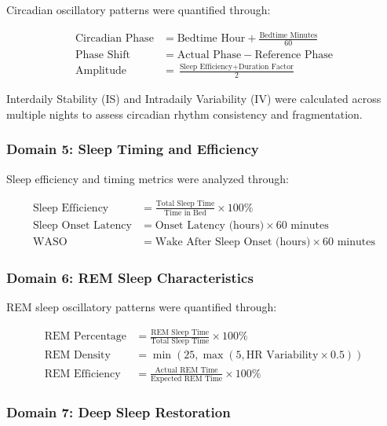 \documentclass[twocolumn]{article}
\begin{document}
Circadian oscillatory patterns were quantified through:

\begin{align}
\text{Circadian Phase} &= \text{Bedtime Hour} + \frac{\text{Bedtime Minutes}}{60} \\
\text{Phase Shift} &= \text{Actual Phase} - \text{Reference Phase} \\
\text{Amplitude} &= \frac{\text{Sleep Efficiency} + \text{Duration Factor}}{2}
\end{align}

Interdaily Stability (IS) and Intradaily Variability (IV) were calculated across multiple nights to assess circadian rhythm consistency and fragmentation.

\subsubsection{Domain 5: Sleep Timing and Efficiency}

Sleep efficiency and timing metrics were analyzed through:

\begin{align}
\text{Sleep Efficiency} &= \frac{\text{Total Sleep Time}}{\text{Time in Bed}} \times 100\% \\
\text{Sleep Onset Latency} &= \text{Onset Latency (hours)} \times 60 \text{ minutes} \\
\text{WASO} &= \text{Wake After Sleep Onset (hours)} \times 60 \text{ minutes}
\end{align}

\subsubsection{Domain 6: REM Sleep Characteristics}

REM sleep oscillatory patterns were quantified through:

\begin{align}
\text{REM Percentage} &= \frac{\text{REM Sleep Time}}{\text{Total Sleep Time}} \times 100\% \\
\text{REM Density} &= \min(25, \max(5, \text{HR Variability} \times 0.5)) \\
\text{REM Efficiency} &= \frac{\text{Actual REM Time}}{\text{Expected REM Time}} \times 100\%
\end{align}

\subsubsection{Domain 7: Deep Sleep Restoration}
\end{document}
